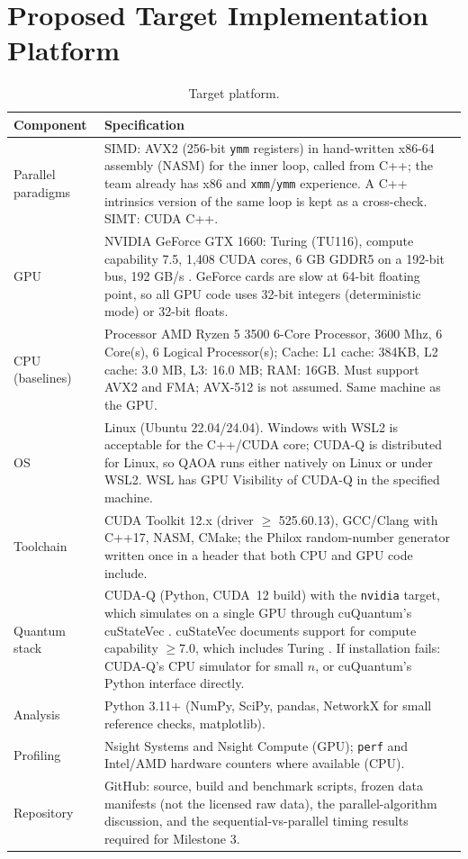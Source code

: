 \section{Proposed Target Implementation Platform}
\label{sec:platform}

\begin{table}[ht]
\centering
\small
\begin{tabularx}{\linewidth}{>{\raggedright\arraybackslash}p{3.2cm}X}
\toprule
Component & Specification \\
\midrule
Parallel paradigms & SIMD: AVX2 (256-bit \texttt{ymm} registers) in hand-written x86-64 assembly (NASM) for the inner loop, called from C++; the team already has x86 and \texttt{xmm}/\texttt{ymm} experience. A C++ intrinsics version of the same loop is kept as a cross-check. SIMT: CUDA C++. \\
GPU & NVIDIA GeForce GTX 1660: Turing (TU116), compute capability 7.5, 1{,}408 CUDA cores, 6 GB GDDR5 on a 192-bit bus, 192 GB/s \cite{gtx1660_specs}. GeForce cards are slow at 64-bit floating point, so all GPU code uses 32-bit integers (deterministic mode) or 32-bit floats. \\
CPU (baselines) & Processor	AMD Ryzen 5 3500 6-Core Processor, 3600 Mhz, 6 Core(s), 6 Logical Processor(s); Cache: L1 cache: 384KB, L2 cache: 3.0 MB, L3: 16.0 MB; RAM: 16GB. Must support AVX2 and FMA; AVX-512 is not assumed. Same machine as the GPU. \\
OS & Linux (Ubuntu 22.04/24.04). Windows with WSL2 is acceptable for the C++/CUDA core; CUDA-Q is distributed for Linux, so QAOA runs either natively on Linux or under WSL2. WSL has GPU Visibility of CUDA-Q in the specified machine. \\
Toolchain & CUDA Toolkit 12.x (driver $\ge$ 525.60.13), GCC/Clang with C++17, NASM, CMake; the Philox random-number generator \cite{salmon2011parallel} written once in a header that both CPU and GPU code include. \\
Quantum stack & CUDA-Q (Python, CUDA~12 build) with the \texttt{nvidia} target, which simulates on a single GPU through cuQuantum's cuStateVec \cite{cudaq_docs,bayraktar2023cuquantum}. cuStateVec documents support for compute capability $\ge 7.0$, which includes Turing \cite{cuquantum_docs}. If installation fails: CUDA-Q's CPU simulator for small $n$, or cuQuantum's Python interface directly. \\
Analysis & Python 3.11+ (NumPy, SciPy, pandas, NetworkX for small reference checks, matplotlib). \\
Profiling & Nsight Systems and Nsight Compute (GPU); \texttt{perf} and Intel/AMD hardware counters where available (CPU). \\
Repository & GitHub: source, build and benchmark scripts, frozen data manifests (not the licensed raw data), the parallel-algorithm discussion, and the sequential-vs-parallel timing results required for Milestone 3. \\
\bottomrule
\end{tabularx}
\caption{Target platform.}
\label{tab:platform}
\end{table}


